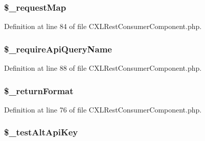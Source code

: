\hypertarget{classCXLRestConsumerComponent_ae2824a887a5fbea2092a494eac8471bb}{
\subsubsection[{\$\_\-requestMap}]{\setlength{\rightskip}{0pt plus 5cm}\$\_\-requestMap}}
\label{classCXLRestConsumerComponent_ae2824a887a5fbea2092a494eac8471bb}


Definition at line 84 of file CXLRestConsumerComponent.php.

\hypertarget{classCXLRestConsumerComponent_ab068ac6d8ffe672d108a88b51f766294}{
\subsubsection[{\$\_\-requireApiQueryName}]{\setlength{\rightskip}{0pt plus 5cm}\$\_\-requireApiQueryName}}
\label{classCXLRestConsumerComponent_ab068ac6d8ffe672d108a88b51f766294}


Definition at line 88 of file CXLRestConsumerComponent.php.

\hypertarget{classCXLRestConsumerComponent_a7ea52a3850e51717b6268b7b9e468684}{
\subsubsection[{\$\_\-returnFormat}]{\setlength{\rightskip}{0pt plus 5cm}\$\_\-returnFormat}}
\label{classCXLRestConsumerComponent_a7ea52a3850e51717b6268b7b9e468684}


Definition at line 76 of file CXLRestConsumerComponent.php.

\hypertarget{classCXLRestConsumerComponent_a043b72271c216d07a270d5b57a17fe59}{
\subsubsection[{\$\_\-testAltApiKey}]{\setlength{\rightskip}{0pt plus 5cm}\$\_\-testAltApiKey}}
\label{classCXLRestConsumerComponent_a043b72271c216d07a270d5b57a17fe59}


